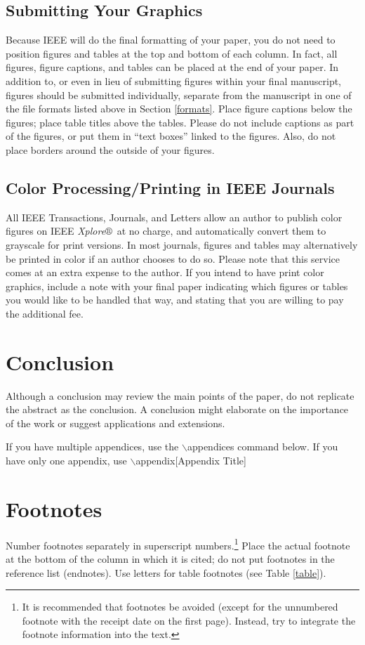 \documentclass{ieeeaccess}
\begin{document}
\subsection{Submitting Your Graphics}
Because IEEE will do the final formatting of your paper,
you do not need to position figures and tables at the top and bottom of each
column. In fact, all figures, figure captions, and tables can be placed at
the end of your paper. In addition to, or even in lieu of submitting figures
within your final manuscript, figures should be submitted individually,
separate from the manuscript in one of the file formats listed above in
Section \ref{formats}. Place figure captions below the figures; place table titles
above the tables. Please do not include captions as part of the figures, or
put them in ``text boxes'' linked to the figures. Also, do not place borders
around the outside of your figures.

\subsection{Color Processing/Printing in IEEE Journals}
All IEEE Transactions, Journals, and Letters allow an author to publish
color figures on IEEE {\it Xplore}$\circledR$\ at no charge, and automatically
convert them to grayscale for print versions. In most journals, figures and
tables may alternatively be printed in color if an author chooses to do so.
Please note that this service comes at an extra expense to the author. If
you intend to have print color graphics, include a note with your final
paper indicating which figures or tables you would like to be handled that
way, and stating that you are willing to pay the additional fee.

\section{Conclusion}
Although a conclusion may review the  main points of the paper, do not replicate the abstract as the conclusion. A
conclusion might elaborate on the importance of the work or suggest
applications and extensions.

If you have multiple appendices, use the $\backslash$appendices command below. If you have only one appendix, use
$\backslash$appendix[Appendix Title]

\appendices
\section{\break Footnotes}
Number footnotes separately in superscript numbers.\footnote{It is recommended that footnotes be avoided (except for
    the unnumbered footnote with the receipt date on the first page). Instead,
    try to integrate the footnote information into the text.} Place the actual
footnote at the bottom of the column in which it is cited; do not put
footnotes in the reference list (endnotes). Use letters for table footnotes
(see Table \ref{table}).
\end{document}

